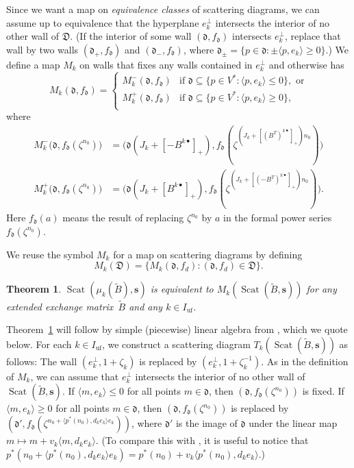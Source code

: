 \documentclass{amsart}
\newtheorem{thm}[proposition]{Theorem}
\theoremstyle{definition}
\theoremstyle{remark}
\numberwithin{equation}{section}
\newcommand{\uf}{{\operatorname{uf}}}
\newcommand{\set}[1]{{\lbrace #1 \rbrace}}
\newcommand{\br}[1]{{\langle #1 \rangle}}
\newcommand{\D}{{\mathfrak D}}
\newcommand{\0}{{\mathbf{0}}}
\newcommand{\s}{\mathbf{s}}
\newcommand{\tB}{\tilde{B}}
\newcommand{\Scat}{\operatorname{Scat}}
\renewcommand{\d}{{\mathfrak d}}
\begin{document}
Since we want a map on \emph{equivalence classes} of scattering diagrams, we can assume up to equivalence that the hyperplane $e_k^\perp$ intersects the interior of no other wall of $\D$.
(If the interior of some wall $(\d,f_\d)$ intersects $e_k^\perp$, replace that wall by two walls $(\d_+,f_\d)$ and $(\d_-,f_\d)$, where $\d_\pm=\set{p\in\d:\pm\br{p,e_k}\ge0}$.)
We define a map $M_k$ on walls that fixes any walls contained in $e_k^\perp$ and otherwise has
\begin{equation}
M_k(\d,f_\d)=\begin{cases}
M_k^-(\d,f_\d)&\text{if }\d\subseteq \set{p\in V^*:\br{p,e_k}\le0},\text{ or}\\
M_k^+(\d,f_\d)&\text{if }\d\subseteq \set{p\in V^*:\br{p,e_k}\ge0},\\
\end{cases}
\end{equation}
where 
\begin{align}  
M_k^-\bigl(\d,f_\d(\zeta^{n_0})\bigr)&=\bigl(\d(J_k+[-B^{k\bullet}]_+),f_\d(\zeta^{(J_k+[(B^T)^{k\bullet}]_+)n_0})\bigr)\\
M_k^+\bigl(\d,f_\d(\zeta^{n_0})\bigr)&= \bigl(\d(J_k+[B^{k\bullet}]_+),f_\d(\zeta^{(J_k+[(-B^T)^{k\bullet}]_+)n_0})\bigr).
\end{align}
Here $f_\d(a)$ means the result of replacing $\zeta^{n_0}$ by $a$ in the formal power series $f_\d(\zeta^{n_0})$.

We reuse the symbol $M_k$ for a map on scattering diagrams by defining 
\begin{equation}
M_k(\D)=\set{M_k(\d,f_d):(\d,f_d)\in\D}.
\end{equation}

\begin{thm}\label{mut thm}
$\Scat(\mu_k(\tB),\s)$ is equivalent to $M_k(\Scat(\tB,\s))$ for any extended exchange matrix~$\tB$ and any $k\in I_\uf$.
\end{thm}

Theorem~\ref{mut thm} will follow by simple (piecewise) linear algebra from \cite[Theorem~1.24]{GHKK}, which we quote below.
For each $k\in I_\uf$, we construct a scattering diagram $T_k(\Scat(\tB,\s))$ as follows:
The wall $(e_k^\perp,1+\zeta_k)$ is replaced by $(e_k^\perp,1+\zeta_k^{-1})$.
As in the definition of $M_k$, we can assume that $e_k^\perp$ intersects the interior of no other wall of $\Scat(\tB,\s)$.
If $\br{m,e_k}\le0$ for all points $m\in\d$, then $(\d,f_\d(\zeta^{n_0}))$ is fixed.
If $\br{m,e_k}\ge0$ for all points $m\in\d$, then $(\d,f_\d(\zeta^{n_0}))$ is replaced by $(\d',f_\d(\zeta^{n_0+\br{p^*(n_0),d_ke_k}e_k}))$, where $\d'$ is the image of $\d$ under the linear map $m\mapsto m+v_k\br{m,d_ke_k}$.
(To compare this with \cite[(1.23)]{GHKK}, it is useful to notice that $p^*(n_0+\br{p^*(n_0),d_ke_k}e_k)=p^*(n_0)+v_k\br{p^*(n_0),d_ke_k}$.)
\end{document}
